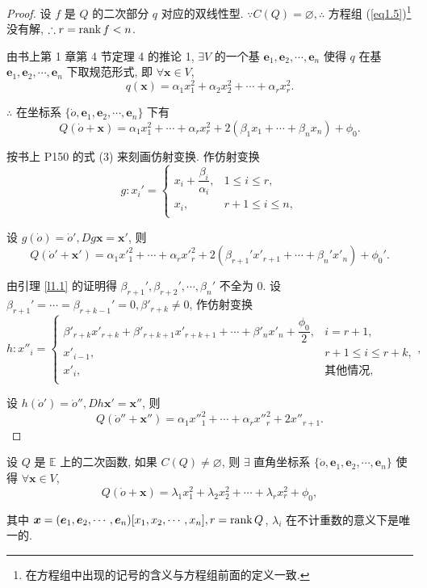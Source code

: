 \documentclass{ctexart}
\begin{document}
\begin{proof}
    设 $f$ 是 $Q$ 的二次部分 $q$ 对应的双线性型. $\because C(Q)=\varnothing,\therefore$ 方程组 (\ref{eq1.5})\footnote{在方程组中出现的记号的含义与方程组前面的定义一致.} 没有解, $\therefore r=\operatorname{rank} f<n$.

    由书上第 1 章第 4 节定理 4 的推论 1, $\exists V$ 的一个基 $\boldsymbol{e}_1,\boldsymbol{e}_2,\cdots,\boldsymbol{e}_n$ 使得 $q$ 在基 $\boldsymbol{e}_1,\boldsymbol{e}_2,\cdots,\boldsymbol{e}_n$ 下取规范形式, 即 $\forall\boldsymbol{x}\in V$,
    \[q(\boldsymbol{x})=\alpha_1x^2_1+\alpha_2x^2_2+\cdots+\alpha_rx^2_r.\]

    $\therefore$ 在坐标系 $\{\dot{o},\boldsymbol{e}_1,\boldsymbol{e}_2,\cdots,\boldsymbol{e}_n\}$ 下有
    \[Q(\dot{o}+\boldsymbol{x})=\alpha_1x^2_1+\cdots+\alpha_rx^2_r+2(\beta_1x_1+\cdots+\beta_nx_n)+\phi_0.\]

    按书上 P150 的式 (3) 来刻画仿射变换. 作仿射变换
    \[g:x_i'=\begin{cases}
        x_i+\dfrac{\beta_i}{\alpha_i}, & 1\leq i\leq r, \\
        x_i, & r+1\leq i\leq n, \\
    \end{cases}\]

    设 $g(\dot{o})=\dot{o}',Dg\boldsymbol{x}=\boldsymbol{x}'$, 则
    \[Q(\dot{o}'+\boldsymbol{x}')=\alpha_1x'^2_1+\cdots+\alpha_rx'^2_r+2(\beta_{r+1}'x'_{r+1}+\cdots+\beta_n'x'_n)+\phi_0'.\]

    由引理 \ref{l1.1} 的证明得 $\beta_{r+1}',\beta_{r+2}',\cdots,\beta_n'$ 不全为 $0$. 设 $\beta_{r+1}'=\cdots=\beta_{r+k-1}'=0,\beta'_{r+k}\neq0$, 作仿射变换
    \[h:x''_i=\begin{cases}
        \beta'_{r+k}x'_{r+k}+\beta'_{r+k+1}x'_{r+k+1}+\cdots+\beta'_nx'_n+\dfrac{\phi_0}{2}, & i=r+1, \\
        x'_{i-1}, & r+1\leq i\leq r+k, \\
        x'_i, & \text{其他情况}, \\
    \end{cases},\]

    设 $h(\dot{o}')=\dot{o}'',Dh\boldsymbol{x}'=\boldsymbol{x}''$, 则
    \[Q(\dot{o}''+\boldsymbol{x}'')=\alpha_1x''^2_1+\cdots+\alpha_rx''^2_r+2x''_{r+1}.\]
\end{proof}
\begin{theorem}
    设 $Q$ 是 $\mathbb{E}$ 上的二次函数, 如果 $C(Q)\neq\varnothing$, 则 $\exists$ 直角坐标系 $\{\dot{o},\boldsymbol{e}_1,\boldsymbol{e}_2,\cdots,\boldsymbol{e}_n\}$ 使得 $\forall\boldsymbol{x}\in V$,
    \[Q(\dot{o}+\boldsymbol{x})=\lambda_1x^2_1+\lambda_2x^2_2+\cdots+\lambda_rx^2_r+\phi_0,\]

    其中 $\boldsymbol{x}=(\boldsymbol{e}_1,\boldsymbol{e}_2,\cdots,\boldsymbol{e}_n)[x_1,x_2,\cdots,x_n],r=\operatorname{rank} Q$, $\lambda_i$ 在不计重数的意义下是唯一的.
\end{theorem}
\end{document}
